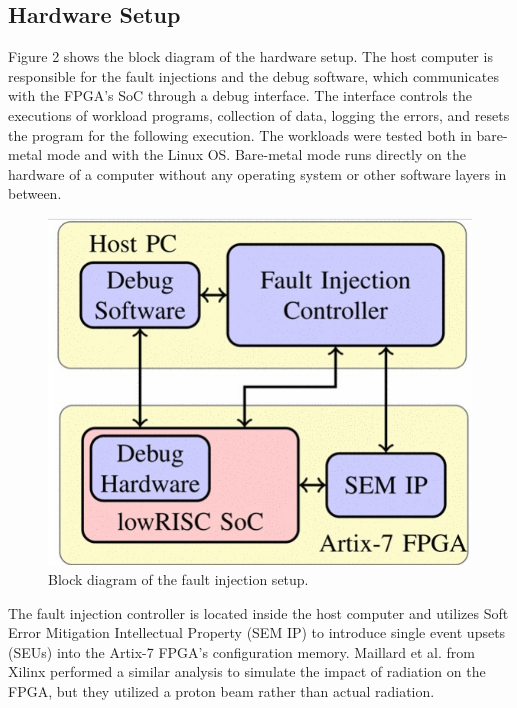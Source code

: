\documentclass[conference]{IEEEtran}
\begin{document}
\subsection{Hardware Setup}
Figure 2 shows the block diagram of the hardware setup. 
The host computer is responsible for the fault injections and the debug software, which communicates with the FPGA's SoC
through a debug interface. The interface controls the executions of workload programs, collection of data, logging the errors,
and resets the program for the following execution. The workloads were tested both in bare-metal mode and with the Linux OS. 
Bare-metal mode runs directly on the hardware of a computer without any operating system or other software layers in between. 
\begin{figure}[ht]
    \centering
    \includegraphics[scale = 0.5]{fault_inject.jpg}
    \caption{Block diagram of the fault injection setup.}
\end{figure}

The fault injection controller is located inside the host computer and utilizes Soft Error Mitigation Intellectual Property (SEM IP)
to introduce single event upsets (SEUs) into the Artix-7 FPGA's configuration memory. Maillard et al. from Xilinx performed 
a similar analysis\cite{b3} to simulate the impact of radiation on the FPGA, but they utilized a proton beam rather than actual radiation.
\end{document}
